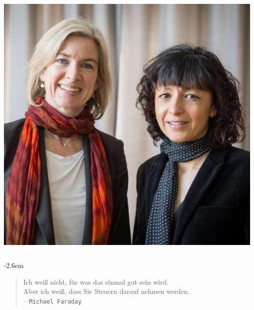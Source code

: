 \documentclass[14pt]{beamer}
\begin{document}
\begin{frame}
\begin{center}
\begin{columns}
\begin{column}{0.4\textwidth}
		\includegraphics[height=0.35\textheight]{crispr_people.jpg}
			\end{column}
		\end{columns}
	\end{center}
\end{frame}

\begin{frame}
	
	\vspace{2em}
	\begingroup
	\advance\leftmargini -2.6em
	\begin{quote}
		Ich weiß nicht, für was das einmal gut sein wird.\\ Aber ich weiß, dass Sie Steuern darauf nehmen werden.\\ -- \texttt{Michael Faraday}
	\end{quote}
	\endgroup
\end{frame}
	
\end{document}
